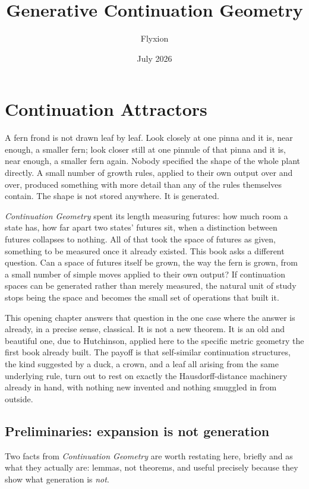 \documentclass[11pt]{report}
\title{\textbf{Generative Continuation Geometry}}
\author{Flyxion}
\date{July 2026}
\begin{document}
\maketitle

\tableofcontents

\chapter{Continuation Attractors}

A fern frond is not drawn leaf by leaf. Look closely at one pinna and
it is, near enough, a smaller fern; look closer still at one pinnule
of that pinna and it is, near enough, a smaller fern again. Nobody
specified the shape of the whole plant directly. A small number of
growth rules, applied to their own output over and over, produced
something with more detail than any of the rules themselves contain.
The shape is not stored anywhere. It is generated.

\emph{Continuation Geometry} spent its length measuring futures:
how much room a state has, how far apart two states' futures sit, when
a distinction between futures collapses to nothing. All of that took
the space of futures as given, something to be measured once it
already existed. This book asks a different question. Can a space of
futures itself be grown, the way the fern is grown, from a small
number of simple moves applied to their own output? If continuation
spaces can be generated rather than merely measured, the natural unit
of study stops being the space and becomes the small set of
operations that built it.

This opening chapter answers that question in the one case where the
answer is already, in a precise sense, classical. It is not a new
theorem. It is an old and beautiful one, due to Hutchinson, applied
here to the specific metric geometry the first book already built. The
payoff is that self-similar continuation structures, the kind
suggested by a duck, a crown, and a leaf all arising from the same
underlying rule, turn out to rest on exactly the Hausdorff-distance
machinery already in hand, with nothing new invented and nothing
smuggled in from outside.

\section*{Preliminaries: expansion is not generation}

Two facts from \emph{Continuation Geometry} are worth restating here,
briefly and as what they actually are: lemmas, not theorems, and
useful precisely because they show what generation is \emph{not}.
\end{document}
